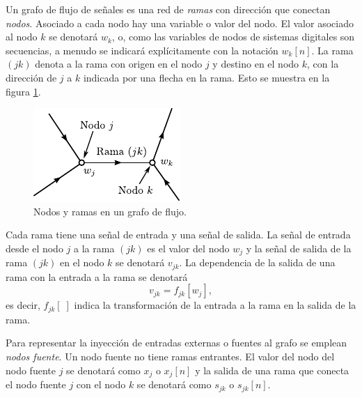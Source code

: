 \documentclass[a4paper]{report}
\begin{document}
Un grafo de flujo de señales es una red de \emph{ramas} con dirección que conectan \emph{nodos}. Asociado a cada nodo hay una variable o valor del nodo. El valor asociado al nodo \(k\) se denotará \(w_k\), o, como las variables de nodos de sistemas digitales son secuencias, a menudo se indicará explícitamente con la notación \(w_k[n]\). La rama \((jk)\) denota a la rama con origen en el nodo \(j\) y destino en el nodo \(k\), con la dirección de \(j\) a \(k\) indicada por una flecha en la rama. Esto se muestra en la figura \ref{fig:structures_flow_graph_branch_and_nodes}.
\begin{figure}[!htb]
 \begin{minipage}[c]{0.3\textwidth}
  \includegraphics[width=\textwidth]{figuras/structures_flow_graph_branch_and_nodes.pdf}
 \end{minipage}\hfill
 \begin{minipage}[c]{0.6\textwidth}
  \caption{
   Nodos y ramas en un grafo de flujo. 
   }\label{fig:structures_flow_graph_branch_and_nodes}
 \end{minipage}
\end{figure} 
Cada rama tiene una señal de entrada y una señal de salida. La señal de entrada desde el nodo \(j\) a la rama \((jk)\) es el valor del nodo \(w_j\) y la señal de salida de la rama \((jk)\) en el nodo \(k\) se denotará \(v_{jk}\). La dependencia de la salida de una rama con la entrada a la rama se denotará
\[
 v_{jk}=f_{jk}[w_j],
\]
es decir, \(f_{jk}[\;]\) indica la transformación de la entrada a la rama en la salida de la rama.

Para representar la inyección de entradas externas o fuentes al grafo se emplean \emph{nodos fuente}. Un nodo fuente no tiene ramas entrantes. El valor del nodo del nodo fuente \(j\) se denotará como \(x_j\) o \(x_j[n]\) y la salida de una rama que conecta el nodo fuente \(j\) con el nodo \(k\) se denotará como \(s_{jk}\) o \(s_{jk}[n]\). 
\end{document}
